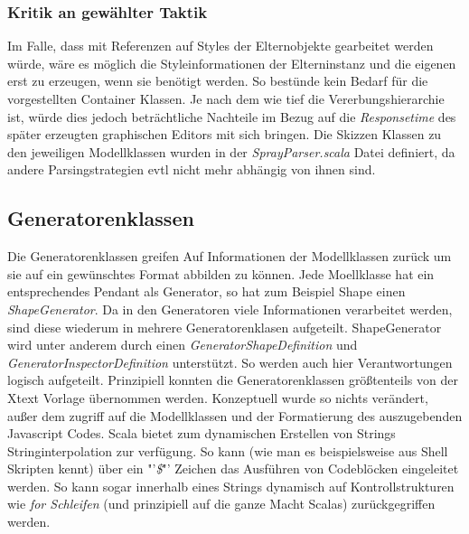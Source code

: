 \subsubsection{Kritik an gewählter Taktik}Im Falle, dass mit Referenzen auf Styles der Elternobjekte gearbeitet werden würde, wäre es möglich die Styleinformationen der Elterninstanz und die eigenen erst zu erzeugen, wenn sie benötigt werden. So bestünde kein Bedarf für die vorgestellten Container Klassen. Je nach dem wie tief die Vererbungshierarchie ist, würde dies jedoch beträchtliche Nachteile im Bezug auf die \textit{Responsetime} des später erzeugten graphischen Editors mit sich bringen. Die Skizzen Klassen zu den jeweiligen Modellklassen wurden in der \textit{SprayParser.scala} Datei definiert, da andere Parsingstrategien evtl nicht mehr abhängig von ihnen sind.
\subsection{Generatorenklassen}
Die Generatorenklassen greifen Auf Informationen der Modellklassen zurück um sie auf ein gewünschtes Format abbilden zu können. Jede Moellklasse hat ein entsprechendes Pendant als Generator, so hat zum Beispiel Shape einen \textit{ShapeGenerator}. Da in den Generatoren viele Informationen verarbeitet werden, sind diese wiederum in mehrere Generatorenklasen aufgeteilt. ShapeGenerator wird unter anderem durch einen \textit{GeneratorShapeDefinition} und \textit{GeneratorInspectorDefinition} unterstützt. So werden auch hier Verantwortungen logisch aufgeteilt. Prinzipiell konnten die Generatorenklassen größtenteils von der Xtext Vorlage übernommen werden. Konzeptuell wurde so nichts verändert, außer dem zugriff auf die Modellklassen und der Formatierung des auszugebenden Javascript Codes. Scala bietet zum dynamischen Erstellen von Strings Stringinterpolation zur verfügung. So kann (wie man es beispielsweise aus Shell Skripten kennt) über ein "'\textit{\$}"' Zeichen das Ausführen von Codeblöcken eingeleitet werden. So kann sogar innerhalb eines Strings dynamisch auf Kontrollstrukturen wie \textit{for Schleifen} (und prinzipiell auf die ganze Macht Scalas) zurückgegriffen werden.
